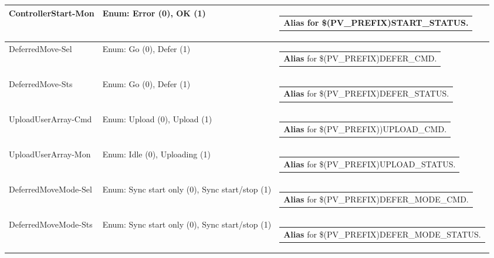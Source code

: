 \documentclass[openany]{article}
\begin{document}
\begin{longtable}{| m{4.5cm} m{2.5cm}  m{8.5cm} |}
        ControllerStart-Mon & Enum: Error (0), OK (1)  & \begin{tabular}{@{}m{6cm}@{}}
                \textbf{\color{blue} Alias} for \$(PV\_PREFIX)START\_STATUS.
            \end{tabular} \hypertarget{pv:deferred-move}{}\\ \hline
        DeferredMove-Sel & Enum: Go (0), Defer (1) & \begin{tabular}{@{}m{6cm}@{}}
                \textbf{\color{blue} Alias} for \$(PV\_PREFIX)DEFER\_CMD.
            \end{tabular} \hypertarget{}{}\\ \hline
        DeferredMove-Sts & Enum: Go (0), Defer (1) & \begin{tabular}{@{}m{6cm}@{}}
                \textbf{\color{blue} Alias} for \$(PV\_PREFIX)DEFER\_STATUS.
            \end{tabular} \hypertarget{pv:upload-user-array-cmd}{}\\ \hline
        UploadUserArray-Cmd & Enum: Upload (0), Upload (1) & \begin{tabular}{@{}m{6cm}@{}}
                \textbf{\color{blue} Alias} for \$(PV\_PREFIX))UPLOAD\_CMD.
            \end{tabular} \hypertarget{pv:upload-user-array-mon}{}\\ \hline
        UploadUserArray-Mon & Enum: Idle (0), Uploading (1) & \begin{tabular}{@{}m{6cm}@{}}
                \textbf{\color{blue} Alias} for \$(PV\_PREFIX)UPLOAD\_STATUS.
            \end{tabular} \hypertarget{pv:deferred-move-mode}{}\\ \hline
        DeferredMoveMode-Sel & Enum: Sync start only (0), Sync start/stop (1) & \begin{tabular}{@{}m{6cm}@{}}
                \textbf{\color{blue} Alias} for \$(PV\_PREFIX)DEFER\_MODE\_CMD.
            \end{tabular} \hypertarget{}{}\\ \hline
        DeferredMoveMode-Sts & Enum: Sync start only (0), Sync start/stop (1) & \begin{tabular}{@{}m{6cm}@{}}
                \textbf{\color{blue} Alias} for \$(PV\_PREFIX)DEFER\_MODE\_STATUS.
            \end{tabular} \hypertarget{pv:controller-err-mon}{}\\ \hline

\end{longtable}
\end{document}
